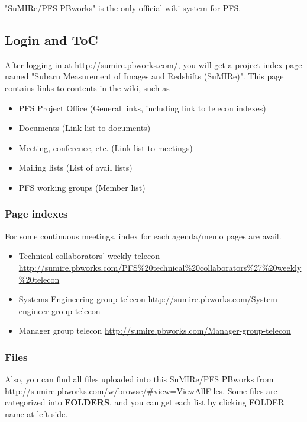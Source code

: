 \documentclass[a4paper,notitlepage]{article}
\begin{document}
"SuMIRe/PFS PBworks" is the only official wiki system for PFS. 

\subsection{Login and ToC}

After logging in at \url{http://sumire.pbworks.com/}, 
you will get a project index page named 
"Subaru Measurement of Images and Redshifts (SuMIRe)". 
This page contains links to contents in the wiki, such as 

\begin{itemize}
  \item PFS Project Office (General links, including link to telecon indexes)
  \item Documents (Link list to documents)
  \item Meeting, conference, etc.  (Link list to meetings)
  \item Mailing lists (List of avail lists)
  \item PFS working groups (Member list)
\end{itemize}

\subsubsection{Page indexes}

For some continuous meetings, index for each agenda/memo pages are avail.

\begin{itemize}
  \item Technical collaborators' weekly telecon \url{http://sumire.pbworks.com/PFS%20technical%20collaborators%27%20weekly%20telecon}
  \item Systems Engineering group telecon \url{http://sumire.pbworks.com/System-engineer-group-telecon}
  \item Manager group telecon \url{http://sumire.pbworks.com/Manager-group-telecon}
\end{itemize}


\subsubsection{Files}

Also, you can find all files uploaded into this SuMIRe/PFS PBworks from 
\url{http://sumire.pbworks.com/w/browse/#view=ViewAllFiles}.
Some files are categorized into {\bf FOLDERS}, and you can get each list by 
clicking FOLDER name at left side. 
\end{document}
